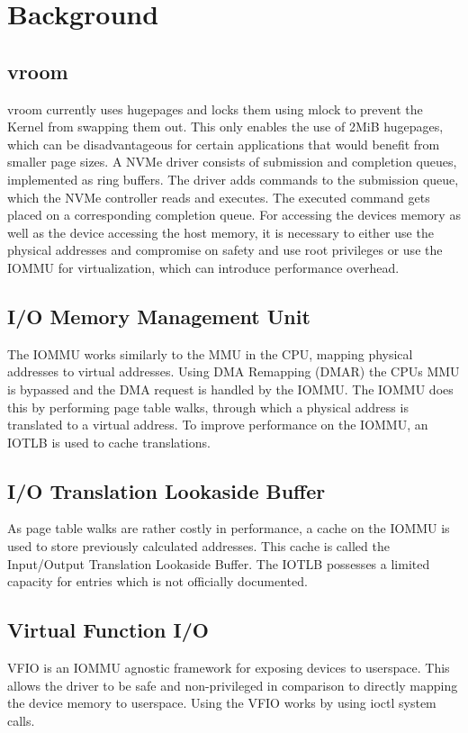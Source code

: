 \chapter{Background}

\section{vroom}
vroom currently uses hugepages and locks them using mlock to prevent the Kernel from swapping them out.
This only enables the use of 2MiB hugepages, which can be disadvantageous for certain applications that would benefit from smaller page sizes.
A NVMe driver consists of submission and completion queues, implemented as ring buffers.
The driver adds commands to the submission queue, which the NVMe controller reads and executes.
The executed command gets placed on a corresponding completion queue.
For accessing the devices memory as well as the device accessing the host memory, it is necessary to either use the physical addresses and compromise on safety and use root privileges or use the IOMMU for virtualization, which can introduce performance overhead.

\section{I/O Memory Management Unit}
The IOMMU works similarly to the MMU in the CPU, mapping physical addresses to virtual addresses.
Using DMA Remapping (DMAR) the CPUs MMU is bypassed and the DMA request is handled by the IOMMU.
The IOMMU does this by performing page table walks, through which a physical address is translated to a virtual address.
To improve performance on the IOMMU, an IOTLB is used to cache translations.

\section{I/O Translation Lookaside Buffer}
As page table walks are rather costly in performance, a cache on the IOMMU is used to store previously calculated addresses. This cache is called the Input/Output Translation Lookaside Buffer. The IOTLB possesses a limited capacity for entries which is not officially documented.

\section{Virtual Function I/O}
VFIO is an IOMMU agnostic framework for exposing devices to userspace.
This allows the driver to be safe and non-privileged in comparison to directly mapping the device memory to userspace.
Using the VFIO works by using ioctl system calls.

